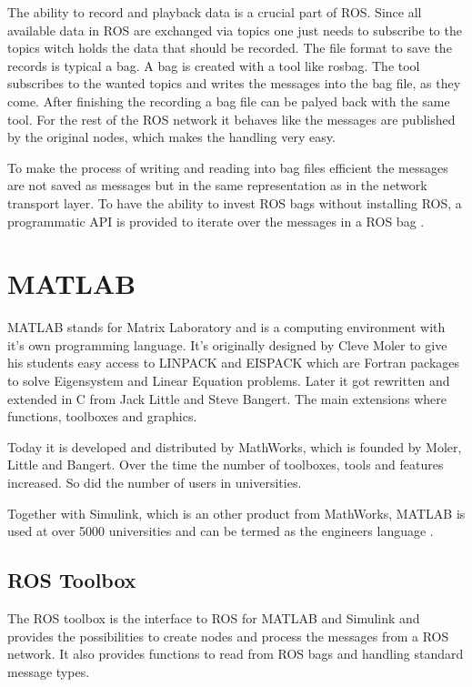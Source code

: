 The ability to record and playback data is a crucial part of ROS.
Since all available data in ROS are exchanged via topics one just needs to subscribe to the topics witch holds the data that should be recorded.
The file format to save the records is typical a bag.
A bag is created with a tool like rosbag.
The tool subscribes to the wanted topics and writes the messages into the bag file, as they come.
After finishing the recording a bag file can be palyed back with the same tool.
For the rest of the ROS network it behaves like the messages are published by the original nodes, which makes the handling very easy.

To make the process of writing and reading into bag files efficient the messages are not saved as messages but in the same representation as in the network transport layer.
To have the ability to invest \ac{ROS} bags without installing \ac{ROS}, a programmatic API is provided to iterate over the messages in a \ac{ROS} bag \cite{rosBag}.


\section{MATLAB}\label{sec:matlab}
MATLAB stands for Matrix Laboratory and is a computing environment with it's own programming language.
It's originally designed by Cleve Moler to give his students easy access to LINPACK and EISPACK which are Fortran packages to solve Eigensystem and Linear Equation problems.
Later it got rewritten and extended in C from Jack Little and Steve Bangert.
The main extensions where functions, toolboxes and graphics.

Today it is developed and distributed by MathWorks, which is founded by Moler, Little and Bangert.
Over the time the number of toolboxes, tools and features increased.
So did the number of users in universities.

Together with Simulink, which is an other product from MathWorks, MATLAB is used at over 5000 universities and can be termed as the engineers language \cite{introductionMatlab}.

\subsection{ROS Toolbox}\label{ssec:rosToolbox}
The \ac{ROS} toolbox is the interface to \ac{ROS} for MATLAB and Simulink and provides the possibilities to create nodes and process the messages from a \ac{ROS} network.
It also provides functions to read from \ac{ROS} bags and handling standard message types.

